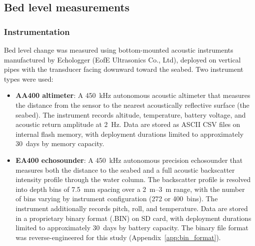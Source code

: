 
\subsection{Bed level measurements}

\subsubsection{Instrumentation}

Bed level change was measured using bottom-mounted acoustic instruments
manufactured by Echologger (EofE Ultrasonics Co., Ltd), deployed on
vertical pipes with the transducer facing downward toward the seabed.
Two instrument types were used:

\begin{itemize}
  \item \textbf{AA400 altimeter}: A \SI{450}{\kilo\hertz} autonomous
    acoustic altimeter that measures the distance from the sensor to the
    nearest acoustically reflective surface (the seabed). The instrument
    records altitude, temperature, battery voltage, and acoustic return
    amplitude at \SI{2}{\hertz}. Data are stored as ASCII CSV files on
    internal flash memory, with deployment durations limited to
    approximately 30~days by memory capacity.

  \item \textbf{EA400 echosounder}: A \SI{450}{\kilo\hertz} autonomous
    precision echosounder that measures both the distance to the seabed
    and a full acoustic backscatter intensity profile through the water
    column. The backscatter profile is resolved into depth bins of
    \SI{7.5}{\milli\meter} spacing over a \SIrange{2}{3}{\meter} range,
    with the number of bins varying by instrument configuration (272 or
    400~bins). The instrument additionally records pitch, roll, and
    temperature. Data are stored in a proprietary binary format (.BIN)
    on SD card, with deployment durations limited to approximately
    30~days by battery capacity. The binary file format was
    reverse-engineered for this study (Appendix~\ref{app:bin_format}).
\end{itemize}


